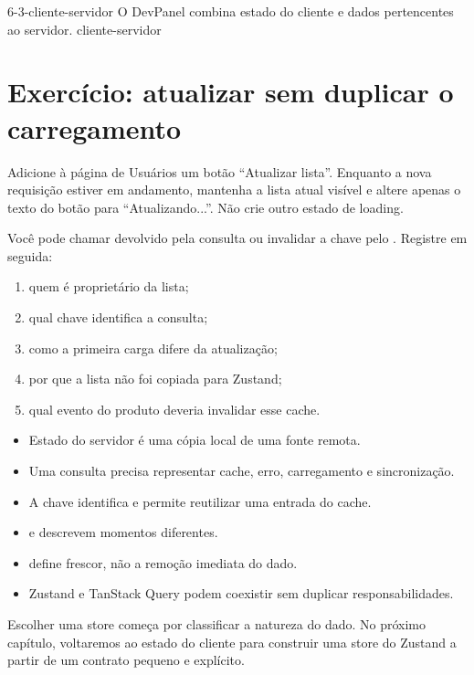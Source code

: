 \imagemcapitulo
  {6-3-cliente-servidor}
  {O DevPanel combina estado do cliente e dados pertencentes ao servidor.}
  {cliente-servidor}

\section{Exercício: atualizar sem duplicar o carregamento}

\begin{tarefa}
Adicione à página de Usuários um botão ``Atualizar lista''. Enquanto a nova
requisição estiver em andamento, mantenha a lista atual visível e altere apenas o
texto do botão para ``Atualizando...''. Não crie outro estado de loading.
\end{tarefa}

Você pode chamar  devolvido pela consulta ou invalidar a chave
\codigo{['users']} pelo . Registre em seguida:

\begin{enumerate}
  \item quem é proprietário da lista;
  \item qual chave identifica a consulta;
  \item como a primeira carga difere da atualização;
  \item por que a lista não foi copiada para Zustand;
  \item qual evento do produto deveria invalidar esse cache.
\end{enumerate}


\begin{resumo}
\begin{itemize}
  \item Estado do servidor é uma cópia local de uma fonte remota.
  \item Uma consulta precisa representar cache, erro, carregamento e
    sincronização.
  \item A chave identifica e permite reutilizar uma entrada do cache.
  \item {} e  descrevem momentos diferentes.
  \item {} define frescor, não a remoção imediata do dado.
  \item Zustand e TanStack Query podem coexistir sem duplicar responsabilidades.
\end{itemize}
\end{resumo}

Escolher uma store começa por classificar a natureza do dado. No próximo
capítulo, voltaremos ao estado do cliente para construir uma store do Zustand a
partir de um contrato pequeno e explícito.
